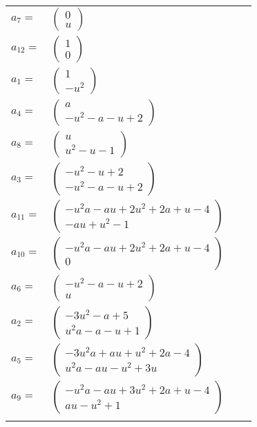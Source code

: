 \documentclass[1p]{elsarticle_modified}
\theoremstyle{definition}
\begin{document}
\begin{tabular}{m{7pt} m{180pt} m{7pt} m{180pt} }
\flushright $a_{7}=$&$\begin{pmatrix}0\\u\end{pmatrix}$ \\
\flushright $a_{12}=$&$\begin{pmatrix}1\\0\end{pmatrix}$ \\
\flushright $a_{1}=$&$\begin{pmatrix}1\\- u^2\end{pmatrix}$ \\
\flushright $a_{4}=$&$\begin{pmatrix}a\\- u^2- a- u+2\end{pmatrix}$ \\
\flushright $a_{8}=$&$\begin{pmatrix}u\\u^2- u-1\end{pmatrix}$ \\
\flushright $a_{3}=$&$\begin{pmatrix}- u^2- u+2\\- u^2- a- u+2\end{pmatrix}$ \\
\flushright $a_{11}=$&$\begin{pmatrix}- u^2 a- a u+2 u^2+2 a+u-4\\- a u+u^2-1\end{pmatrix}$ \\
\flushright $a_{10}=$&$\begin{pmatrix}- u^2 a- a u+2 u^2+2 a+u-4\\0\end{pmatrix}$ \\
\flushright $a_{6}=$&$\begin{pmatrix}- u^2- a- u+2\\u\end{pmatrix}$ \\
\flushright $a_{2}=$&$\begin{pmatrix}-3 u^2- a+5\\u^2 a- a- u+1\end{pmatrix}$ \\
\flushright $a_{5}=$&$\begin{pmatrix}-3 u^2 a+a u+u^2+2 a-4\\u^2 a- a u- u^2+3 u\end{pmatrix}$ \\
\flushright $a_{9}=$&$\begin{pmatrix}- u^2 a- a u+3 u^2+2 a+u-4\\a u- u^2+1\end{pmatrix}$\\&\end{tabular}
\end{document}
